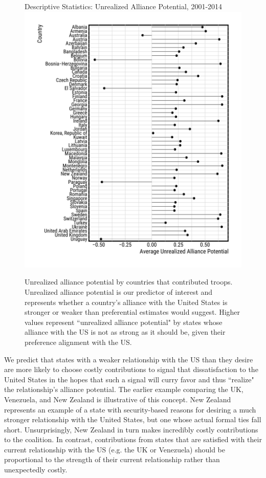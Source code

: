\documentclass[12pt,letterpaper]{article}
\begin{document}
		\newpage
		\begin{figure}[H]
			\begin{center}
				Descriptive Statistics: Unrealized Alliance Potential, 2001-2014
				\vspace{-1em}
				\hspace{-5em}\includegraphics[height = 0.9\textheight]{figures/descriptive_stats.pdf}
				\caption{Unrealized alliance potential by countries that contributed troops. Unrealized alliance potential is our predictor of interest and represents whether a country's alliance with the United States is stronger or weaker than preferential estimates would suggest. Higher values represent ``unrealized alliance potential" by states whose alliance with the US is not as strong as it should be, given their preference alignment with the US.}
				\label{fig:measure_comparison_alliances}
			\end{center}
		\end{figure}
		\newpage

		We predict that states with a weaker relationship with the US than they desire are more likely to choose costly contributions to signal that dissatisfaction to the United States in the hopes that such a signal will curry favor and thus ``realize" the relationship's alliance potential. The earlier example comparing the UK, Venezuela, and New Zealand is illustrative of this concept. New Zealand represents an example of a state with security-based reasons for desiring a much stronger relationship with the United States, but one whose actual formal ties fall short. Unsurprisingly, New Zealand in turn makes incredibly costly contributions to the coalition. In contrast, contributions from states that are satisfied with their current relationship with the US (e.g. the UK or Venezuela) should be proportional to the strength of their current relationship rather than unexpectedly costly.
						
\end{document}
